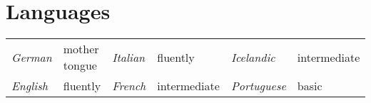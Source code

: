 \documentclass[a4paper]{simplecv}
\begin{document}
\section{Languages}
\label{languages}
\begin{tabular}{llllll}%
{\sf \emph{German}}    & mother tongue \qquad\qquad &
{\sf \emph{Italian}}   & fluently \qquad\qquad\qquad &
{\sf \emph{Icelandic}} & intermediate \\
{\sf \emph{English}}   & fluently &
{\sf \emph{French}}    & intermediate &
{\sf \emph{Portuguese}} & basic
\end{tabular}
%
\iffalse
\begin{topic}
\item[German] mother tongue
\vspace*{-1ex}
\item[English] fluently
\vspace*{-1ex}
\item[Italian] fluently
\vspace*{-1ex}
\item[French] intermediate
\vspace*{-1ex}
\item[Icelandic] basic
\end{topic}
\fi






%
\renewcommand\refname{List of publications}
\label{publications}

%
\end{document}
